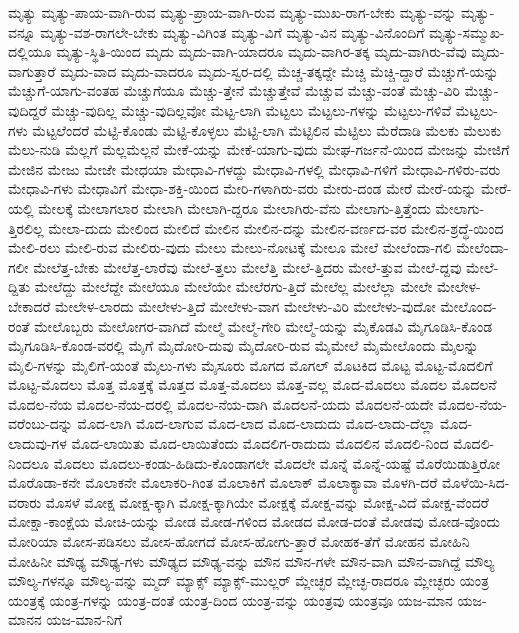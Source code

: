 {ಮೃತ್ಯು
ಮೃತ್ಯು-ಪಾಯ-ವಾಗಿ-ರುವ
ಮೃತ್ಯು-ಪ್ರಾಯ-ವಾಗಿ-ರುವ
ಮೃತ್ಯು-ಮುಖ-ರಾಗ-ಬೇಕು
ಮೃತ್ಯು-ವನ್ನು
ಮೃತ್ಯು-ವನ್ನೂ
ಮೃತ್ಯು-ವಶ-ರಾಗಲೇ-ಬೇಕು
ಮೃತ್ಯು-ವಿಗಿಂತ
ಮೃತ್ಯು-ವಿಗೆ
ಮೃತ್ಯು-ವಿನ
ಮೃತ್ಯು-ವಿನೊಂದಿಗೆ
ಮೃತ್ಯು-ಸಮ್ಮುಖ-ದಲ್ಲಿಯೂ
ಮೃತ್ಯು-ಸ್ಥಿತಿ-ಯಿಂದ
ಮೃದು
ಮೃದು-ವಾಗಿ-ಯಾದರೂ
ಮೃದು-ವಾಗಿರ-ತಕ್ಕ
ಮೃದು-ವಾಗಿರು-ವೆವು
ಮೃದು-ವಾಗುತ್ತಾರೆ
ಮೃದು-ವಾದ
ಮೃದು-ವಾದರೂ
ಮೃದು-ಸ್ವರ-ದಲ್ಲಿ
ಮೆಚ್ಚ-ತಕ್ಕದ್ದೇ
ಮೆಚ್ಚಿ
ಮೆಚ್ಚಿ-ದ್ದಾರೆ
ಮೆಚ್ಚುಗೆ-ಯನ್ನು
ಮೆಚ್ಚುಗೆ-ಯಾಗು-ವಂತಹ
ಮೆಚ್ಚುಗೆಯೂ
ಮೆಚ್ಚು-ತ್ತೇನೆ
ಮೆಚ್ಚುತ್ತೇವೆ
ಮೆಚ್ಚುವ
ಮೆಚ್ಚು-ವಂತೆ
ಮೆಚ್ಚು-ವಿರಿ
ಮೆಚ್ಚು-ವುದಿದ್ದರೆ
ಮೆಚ್ಚು-ವುದಿಲ್ಲ
ಮೆಚ್ಚು-ವುದಿಲ್ಲವೋ
ಮೆಟ್ಟ-ಲಾಗಿ
ಮೆಟ್ಟಲು
ಮೆಟ್ಟಲು-ಗಳನ್ನು
ಮೆಟ್ಟಲು-ಗಳಿವೆ
ಮೆಟ್ಟಲು-ಗಳು
ಮೆಟ್ಟಲೆಂದರೆ
ಮೆಟ್ಟಿ-ಕೊಂಡು
ಮೆಟ್ಟಿ-ಕೊಳ್ಳಲು
ಮೆಟ್ಟಿ-ಲಾಗಿ
ಮೆಟ್ಟಿಲಿನ
ಮೆಟ್ಟಿಲು
ಮೆರೆದಾಡಿ
ಮೆಲಕು
ಮೆಲುಕು
ಮೆಲು-ನುಡಿ
ಮೆಲ್ಲಗೆ
ಮೆಲ್ಲಮೆಲ್ಲನೆ
ಮೇಕೆ-ಯನ್ನು
ಮೇಕೆ-ಯಾಗು-ವುದು
ಮೇಘ-ಗರ್ಜನೆ-ಯಿಂದ
ಮೇಜನ್ನು
ಮೇಜಿಗೆ
ಮೇಜಿನ
ಮೇಜು
ಮೇಜೇ
ಮೇಧಯಾ
ಮೇಧಾವಿ-ಗಳದ್ದು
ಮೇಧಾವಿ-ಗಳಲ್ಲಿ
ಮೇಧಾವಿ-ಗಳಿಗೆ
ಮೇಧಾವಿ-ಗಳಿರು-ವರು
ಮೇಧಾವಿ-ಗಳು
ಮೇಧಾವಿಗೆ
ಮೇಧಾ-ಶಕ್ತಿ-ಯಿಂದ
ಮೇರಿ-ಗಳಾಗಿರು-ವರು
ಮೇರು-ದಂಡ
ಮೇರೆ
ಮೇರೆ-ಯನ್ನು
ಮೇರೆ-ಯಲ್ಲಿ
ಮೇಲಕ್ಕೆ
ಮೇಲಾಗಲಾರ
ಮೇಲಾಗಿ
ಮೇಲಾಗಿ-ದ್ದರೂ
ಮೇಲಾಗಿರು-ವೆನು
ಮೇಲಾಗು-ತ್ತಿತ್ತೆಂದು
ಮೇಲಾಗು-ತ್ತಿರಲಿಲ್ಲ
ಮೇಲಾ-ದುದು
ಮೇಲಿಂದ
ಮೇಲಿದೆ
ಮೇಲಿನ
ಮೇಲಿನ-ದನ್ನು
ಮೇಲಿನ-ವರ್ಣದ-ವರ
ಮೇಲಿನ-ಶ್ರದ್ಧೆ-ಯಿಂದ
ಮೇಲಿ-ರಲು
ಮೇಲಿ-ರುವ
ಮೇಲಿರು-ವುದು
ಮೇಲು
ಮೇಲು-ನೋಟಕ್ಕೆ
ಮೇಲೂ
ಮೇಲೆ
ಮೇಲೆಂದಾ-ಗಲಿ
ಮೇಲೆಂದಾ-ಗಲೀ
ಮೇಲೆತ್ತ-ಬೇಕು
ಮೇಲೆತ್ತ-ಲಾರೆವು
ಮೇಲೆ-ತ್ತಲು
ಮೇಲೆತ್ತಿ
ಮೇಲೆ-ತ್ತಿದರು
ಮೇಲೆ-ತ್ತುವ
ಮೇಲೆ-ದ್ದವು
ಮೇಲೆ-ದ್ದಿತು
ಮೇಲೆದ್ದು
ಮೇಲೆದ್ದೇ
ಮೇಲೆಯೂ
ಮೇಲೆಯೇ
ಮೇಲೆರಗು-ತ್ತಿದೆ
ಮೇಲೆಲ್ಲ
ಮೇಲೆಲ್ಲಾ
ಮೇಲೇ
ಮೇಲೇಳ-ಬೇಕಾದರೆ
ಮೇಲೇಳ-ಲಾರದು
ಮೇಲೇಳು-ತ್ತಿದೆ
ಮೇಲೇಳು-ವಾಗ
ಮೇಲೇಳು-ವಿರಿ
ಮೇಲೇಳು-ವುದೋ
ಮೇಲೊಂದ-ರಂತೆ
ಮೇಲೊಬ್ಬರು
ಮೇಲೋಗರ-ವಾಗಿದೆ
ಮೇಲ್ಮೆ
ಮೇಲ್ಮೆ-ಗೇರಿ
ಮೇಲ್ಮೆ-ಯನ್ನು
ಮೈಕೊಡವಿ
ಮೈಗೂಡಿಸಿ-ಕೊಂಡ
ಮೈಗೂಡಿಸಿ-ಕೊಂಡ-ವರಲ್ಲಿ
ಮೈಗೆ
ಮೈದೋರಿ-ದುವು
ಮೈದೋರಿ-ರುವ
ಮೈಮೇಲೆ
ಮೈಮೇಲೊಂದು
ಮೈಲನ್ನು
ಮೈಲಿ-ಗಳನ್ನು
ಮೈಲಿಗೆ-ಯಂತೆ
ಮೈಲು-ಗಳು
ಮೈಸೂರು
ಮೊಗದ
ಮೊಗಲ್
ಮೊಟಕಿದ
ಮೊಟ್ಟ
ಮೊಟ್ಟ-ಮೊದಲಿಗೆ
ಮೊಟ್ಟ-ಮೊದಲು
ಮೊತ್ತ
ಮೊತ್ತಕ್ಕೆ
ಮೊತ್ತದ
ಮೊತ್ತ-ಮೊದಲು
ಮೊತ್ತ-ವಲ್ಲ
ಮೊದ-ಮೊದಲು
ಮೊದಲ
ಮೊದಲನೆ
ಮೊದಲ-ನೆಯ
ಮೊದಲ-ನೆಯ-ದರಲ್ಲಿ
ಮೊದಲ-ನೆಯ-ದಾಗಿ
ಮೊದಲನೆ-ಯದು
ಮೊದಲನೆ-ಯದೇ
ಮೊದಲ-ನೆಯ-ವರೆಂಬು-ದನ್ನು
ಮೊದ-ಲಾಗಿ
ಮೊದ-ಲಾಗುವ
ಮೊದ-ಲಾದ
ಮೊದ-ಲಾದುದು
ಮೊದ-ಲಾದು-ದೆಲ್ಲಾ
ಮೊದ-ಲಾದುವು-ಗಳ
ಮೊದ-ಲಾಯಿತು
ಮೊದ-ಲಾಯಿತೆಂದು
ಮೊದಲಿಗ-ರಾದುದು
ಮೊದಲಿನ
ಮೊದಲಿ-ನಿಂದ
ಮೊದಲಿ-ನಿಂದಲೂ
ಮೊದಲು
ಮೊದಲು-ಕಂಡು-ಹಿಡಿದು-ಕೊಂಡಾಗಲೇ
ಮೊದಲೇ
ಮೊನ್ನೆ
ಮೊನ್ನೆ-ಯಷ್ಟೆ
ಮೊರೆಯಿಡುತ್ತಿರೋ
ಮೊರೊಡಾ-ಕನೇ
ಮೊಲಾಕನೇ
ಮೊಲಾಕರಿ-ಗಿಂತ
ಮೊಲಾಕಿಗೆ
ಮೊಲಾಕ್
ಮೊಲಾಕ್ಯಾವಾ
ಮೊಳಗಿ-ದರೆ
ಮೊಳೆಯಿ-ಸಿದ-ವರಾರು
ಮೊಸಳೆ
ಮೋಕ್ಷ
ಮೋಕ್ಷ-ಕ್ಕಾಗಿ
ಮೋಕ್ಷ-ಕ್ಕಾಗಿಯೇ
ಮೋಕ್ಷಕ್ಕೆ
ಮೋಕ್ಷ-ವನ್ನು
ಮೋಕ್ಷ-ವಿದೆ
ಮೋಕ್ಷ-ವೆಂದರೆ
ಮೋಕ್ಷಾ-ಕಾಂಕ್ಷೆಯ
ಮೋಚಿ-ಯನ್ನು
ಮೋಡ
ಮೋಡ-ಗಳಿಂದ
ಮೋಡದ
ಮೋಡ-ದಂತೆ
ಮೋಡವು
ಮೋಡ-ವೊಂದು
ಮೋರಿಯಾ
ಮೋಸ-ಪಡಿಸಲು
ಮೋಸ-ಹೋಗದೆ
ಮೋಸ-ಹೋಗು-ತ್ತಾರೆ
ಮೋಹಕ-ತೆಗೆ
ಮೋಹನ
ಮೋಹಿನಿ
ಮೋಹಿನೀ
ಮೌಢ್ಯ
ಮೌಢ್ಯ-ಗಳು
ಮೌಢ್ಯದ
ಮೌಢ್ಯ-ವನ್ನು
ಮೌನ
ಮೌನ-ಗಳೇ
ಮೌನ-ವಾಗಿ
ಮೌನ-ವಾಗಿದ್ದೆ
ಮೌಲ್ಯ
ಮೌಲ್ಯ-ಗಳನ್ನೂ
ಮೌಲ್ಯ-ವನ್ನು
ಮ್ಮದ್
ಮ್ಯಾಕ್ಸ್
ಮ್ಯಾಕ್ಸ್-ಮುಲ್ಲರ್
ಮ್ಲೇಚ್ಛರ
ಮ್ಲೇಚ್ಛ-ರಾದರೂ
ಮ್ಲೇಚ್ಛರು
ಯಂತ್ರ
ಯಂತ್ರಕ್ಕೆ
ಯಂತ್ರ-ಗಳನ್ನು
ಯಂತ್ರ-ದಂತೆ
ಯಂತ್ರ-ದಿಂದ
ಯಂತ್ರ-ವನ್ನು
ಯಂತ್ರವು
ಯಂತ್ರವೂ
ಯಜ-ಮಾನ
ಯಜ-ಮಾನನ
ಯಜ-ಮಾನ-ನಿಗೆ
}
